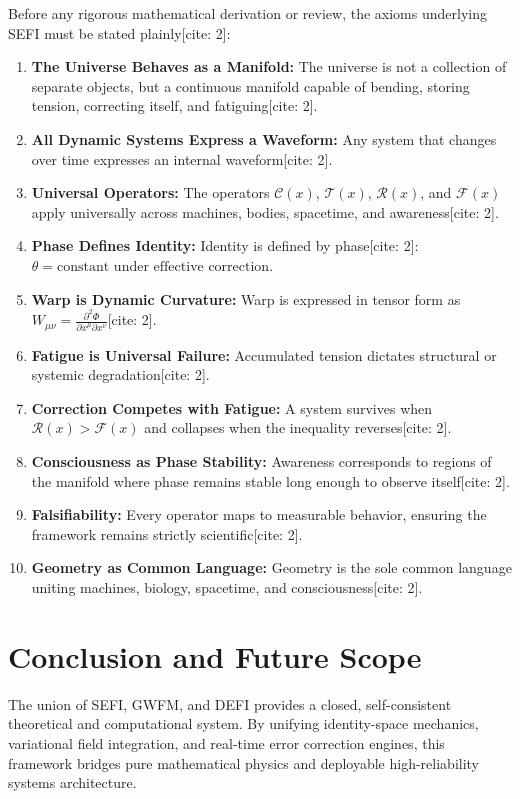 \documentclass[11pt,book]{report}
\begin{document}
Before any rigorous mathematical derivation or review, the axioms underlying SEFI must be stated plainly[cite: 2]:
\begin{enumerate}
    \item \textbf{The Universe Behaves as a Manifold:} The universe is not a collection of separate objects, but a continuous manifold capable of bending, storing tension, correcting itself, and fatiguing[cite: 2].
    \item \textbf{All Dynamic Systems Express a Waveform:} Any system that changes over time expresses an internal waveform[cite: 2].
    \item \textbf{Universal Operators:} The operators $\mathcal{C}(x)$, $\mathcal{T}(x)$, $\mathcal{R}(x)$, and $\mathcal{F}(x)$ apply universally across machines, bodies, spacetime, and awareness[cite: 2].
    \item \textbf{Phase Defines Identity:} Identity is defined by phase[cite: 2]: $\theta = \text{constant under effective correction}$.
    \item \textbf{Warp is Dynamic Curvature:} Warp is expressed in tensor form as $W_{\mu\nu} = \frac{\partial^2 \Phi}{\partial x^\mu \partial x^\nu}$[cite: 2].
    \item \textbf{Fatigue is Universal Failure:} Accumulated tension dictates structural or systemic degradation[cite: 2].
    \item \textbf{Correction Competes with Fatigue:} A system survives when $\mathcal{R}(x) > \mathcal{F}(x)$ and collapses when the inequality reverses[cite: 2].
    \item \textbf{Consciousness as Phase Stability:} Awareness corresponds to regions of the manifold where phase remains stable long enough to observe itself[cite: 2].
    \item \textbf{Falsifiability:} Every operator maps to measurable behavior, ensuring the framework remains strictly scientific[cite: 2].
    \item \textbf{Geometry as Common Language:} Geometry is the sole common language uniting machines, biology, spacetime, and consciousness[cite: 2].
\end{enumerate}

\chapter{Conclusion and Future Scope}

The union of SEFI, GWFM, and DEFI provides a closed, self-consistent theoretical and computational system. By unifying identity-space mechanics, variational field integration, and real-time error correction engines, this framework bridges pure mathematical physics and deployable high-reliability systems architecture.
\end{document}
